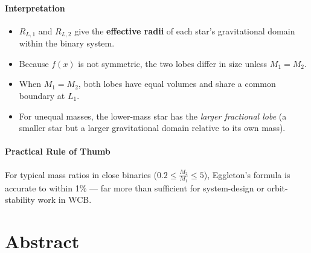 \documentclass[
  letterpaper,
]{book}
\providecommand{\tightlist}{%
  \setlength{\itemsep}{0pt}\setlength{\parskip}{0pt}}
\begin{document}
\subsubsection{Interpretation}\label{interpretation}

\begin{itemize}
\tightlist
\item
  \(R_{L,1}\) and \(R_{L,2}\) give the \textbf{effective radii} of each
  star's gravitational domain within the binary system.\\
\item
  Because \(f(x)\) is not symmetric, the two lobes differ in size unless
  \(M_1 = M_2\).\\
\item
  When \(M_1 = M_2\), both lobes have equal volumes and share a common
  boundary at \(L_1\).\\
\item
  For unequal masses, the lower-mass star has the \emph{larger
  fractional lobe} (a smaller star but a larger gravitational domain
  relative to its own mass).
\end{itemize}

\subsubsection{Practical Rule of Thumb}\label{practical-rule-of-thumb}

For typical mass ratios in close binaries
(\(0.2 \le \frac{M_2}{M_1} \le 5\)), Eggleton's formula is accurate to
within 1\% --- far more than sufficient for system-design or
orbit-stability work in WCB.

\chapter{Abstract}\label{abstract-46}
\end{document}
